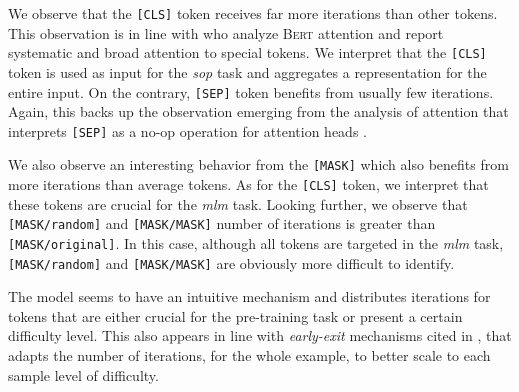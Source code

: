 We observe that the \texttt{[CLS]} token receives far more iterations than other tokens. This observation is in line with \textcite{clark_19} who analyze \textsc{Bert}  attention and report systematic and broad attention to special tokens. We interpret that the \texttt{[CLS]} token is used as input for the \textit{sop} task and aggregates a representation for the entire input. On the contrary, \texttt{[SEP]} token benefits from usually few iterations. Again, this backs up the observation emerging from the analysis of attention that interprets \texttt{[SEP]} as a no-op operation for attention heads \parencite{clark_19}.


We also observe an interesting behavior from the \texttt{[MASK]} which also benefits from more iterations than average tokens. As for the \texttt{[CLS]} token, we interpret that these tokens are crucial for the \textit{mlm} task. Looking further, we observe that \texttt{[MASK/random]} and \texttt{[MASK/MASK]} number of iterations is greater than \texttt{[MASK/original]}. In this case, although all tokens are targeted in the \textit{mlm} task, \texttt{[MASK/random]} and \texttt{[MASK/MASK]} are  obviously more difficult to identify.

The model seems to have an intuitive mechanism and distributes iterations for tokens that are either crucial for the pre-training task or present a certain difficulty level. This also appears in line with \textit{early-exit} mechanisms cited in , that adapts the number of iterations, for the whole example, to better scale to each sample level of difficulty.

